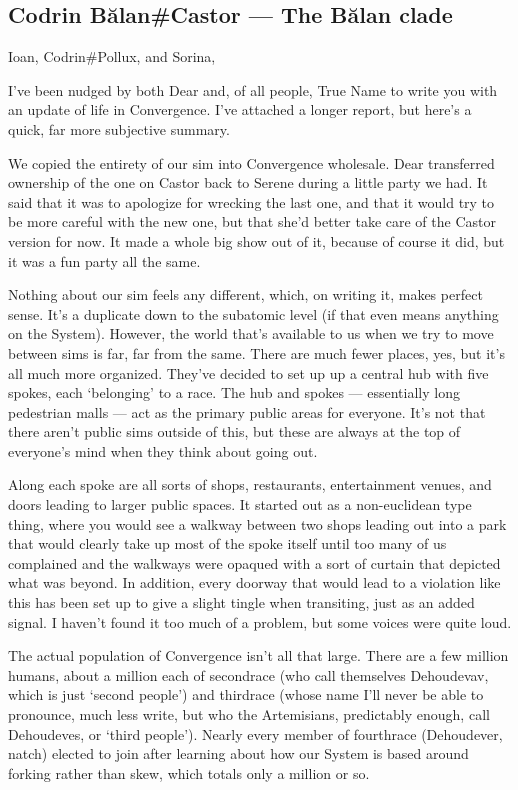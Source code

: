 \hypertarget{codrin-bux103lancastor-the-bux103lan-clade}{%
\subsection{Codrin Bălan\#Castor — The Bălan clade}\label{codrin-bux103lancastor-the-bux103lan-clade}}

Ioan, Codrin\#Pollux, and Sorina,

I've been nudged by both Dear and, of all people, True Name to write you with an update of life in Convergence. I've attached a longer report, but here's a quick, far more subjective summary.

We copied the entirety of our sim into Convergence wholesale. Dear transferred ownership of the one on Castor back to Serene during a little party we had. It said that it was to apologize for wrecking the last one, and that it would try to be more careful with the new one, but that she'd better take care of the Castor version for now. It made a whole big show out of it, because of course it did, but it was a fun party all the same.

Nothing about our sim feels any different, which, on writing it, makes perfect sense. It's a duplicate down to the subatomic level (if that even means anything on the System). However, the world that's available to us when we try to move between sims is far, far from the same. There are much fewer places, yes, but it's all much more organized. They've decided to set up up a central hub with five spokes, each `belonging' to a race. The hub and spokes — essentially long pedestrian malls — act as the primary public areas for everyone. It's not that there aren't public sims outside of this, but these are always at the top of everyone's mind when they think about going out.

Along each spoke are all sorts of shops, restaurants, entertainment venues, and doors leading to larger public spaces. It started out as a non-euclidean type thing, where you would see a walkway between two shops leading out into a park that would clearly take up most of the spoke itself until too many of us complained and the walkways were opaqued with a sort of curtain that depicted what was beyond. In addition, every doorway that would lead to a violation like this has been set up to give a slight tingle when transiting, just as an added signal. I haven't found it too much of a problem, but some voices were quite loud.

The actual population of Convergence isn't all that large. There are a few million humans, about a million each of secondrace (who call themselves Dehoudevav, which is just `second people') and thirdrace (whose name I'll never be able to pronounce, much less write, but who the Artemisians, predictably enough, call Dehoudeves, or `third people'). Nearly every member of fourthrace (Dehoudever, natch) elected to join after learning about how our System is based around forking rather than skew, which totals only a million or so.

